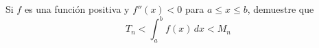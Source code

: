 \item Si $f$ es una función positiva y $f''(x) < 0$ para $a \le x \le b$, demuestre que 
    \[ T_n < \int_a^b f(x) \, dx < M_n \]

